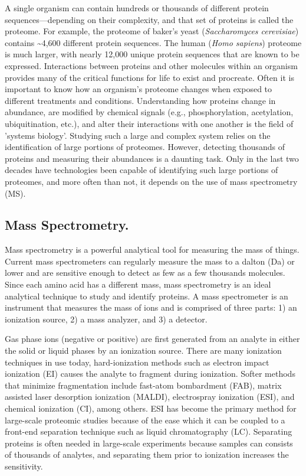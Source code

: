 A single organism can contain hundreds or thousands of different protein sequences---depending on their complexity, and that set of proteins is called the proteome. For example, the proteome of baker's yeast (\emph{Saccharomyces cerevisiae}) contains \textasciitilde4,600 different protein sequences. The human (\emph{Homo sapiens}) proteome is much larger, with nearly 12,000 unique protein sequences that are known to be expressed. Interactions between proteins and other molecules within an organism provides many of the critical functions for life to exist and procreate. Often it is important to know how an organism's proteome changes when exposed to different treatments and conditions. Understanding how proteins change in abundance, are modified by chemical signals (e.g., phosphorylation, acetylation, ubiquitination, etc.), and alter their interactions with one another is the field of 'systems biology'. Studying such a large and complex system relies on the identification of large portions of proteomes. However, detecting thousands of proteins and measuring their abundances is a daunting task. Only in the last two decades have technologies been capable of identifying such large portions of proteomes, and more often than not, it depends on the use of mass spectrometry (MS). 

\subsection*{Mass Spectrometry.}
Mass spectrometry is a powerful analytical tool for measuring the mass of things. Current mass spectrometers can regularly measure the mass to a dalton (Da) or lower and are sensitive enough to detect as few as a few thousands molecules. Since each amino acid has a different mass, mass spectrometry is an ideal analytical technique to study and identify proteins. A mass spectrometer is an instrument that measures the mass of ions and is comprised of three parts: 1) an ionization source, 2) a mass analyzer, and 3) a detector. 

Gas phase ions (negative or positive) are first generated from an analyte in either the solid or liquid phases by an ionization source. There are many ionization techniques in use today, hard-ionization methods such as electron impact ionization (EI) causes the analyte to fragment during ionization. Softer methods that minimize fragmentation include fast-atom bombardment (FAB)\cite{fab}, matrix assisted laser desorption ionization (MALDI)\cite{maldi,maldi2}, electrospray ionization (ESI)\cite{esi}, and chemical ionization (CI)\cite{ci}, among others. ESI has become the primary method for large-scale proteomic studies because of the ease which it can be coupled to a front-end separation technique such as liquid chromatography (LC). Separating proteins is often needed in large-scale experiments because samples can consists of thousands of analytes, and separating them prior to ionization increases the sensitivity. 

